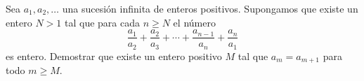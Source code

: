 Sea $a_1, a_2, \dots$ una sucesión infinita de enteros positivos. Supongamos que existe un entero $N \gt 1$ tal que para cada $n \geq N$ el número
\[\frac{a_1}{a_2} + \frac{a_2}{a_3} + \cdots + \frac{a_{n-1}}{a_n} + \frac{a_n}{a_1}\]
es entero. Demostrar que existe un entero positivo $M$ tal que $a_m = a_{m+1}$ para todo $m \geq M$.
